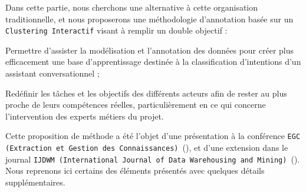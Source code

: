 	Dans cette partie, nous cherchons une alternative à cette organisation traditionnelle, et nous proposerons une méthodologie d'annotation basée sur un \texttt{Clustering Interactif} visant à remplir un double objectif :
	\begin{leftBarImportantRed}
		\begin{todolist}
			\item Permettre d'assister la modélisation et l'annotation des données pour créer plus efficacement une base d'apprentissage destinée à la classification d'intentions d'un assistant conversationnel ;
			\item Redéfinir les tâches et les objectifs des différents acteurs afin de rester au plus proche de leurs compétences réelles, particulièrement en ce qui concerne l'intervention des experts métiers du projet.
		\end{todolist}
	\end{leftBarImportantRed}
	
	\begin{leftBarInformation}
		Cette proposition de méthode a été l'objet d'une présentation à la conférence \texttt{EGC (Extraction et Gestion des Connaissances)}~(\cite{schild-etal:2021:conception-iterative-semisupervisee}), et d'une extension dans le journal \texttt{IJDWM (International Journal of Data Warehousing and Mining)}~(\cite{schild-etal:2022:iterative-semisupervised-design}).
		Nous reprenons ici certains des éléments présentés avec quelques détails supplémentaires.
	\end{leftBarInformation}

	\minitoc


	


	


	